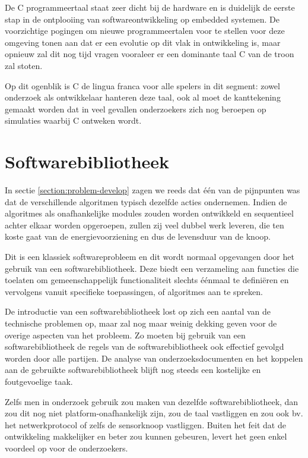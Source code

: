 De C programmeertaal staat zeer dicht bij de hardware en is duidelijk de eerste
stap in de ontplooiing van softwareontwikkeling op embedded systemen. De
voorzichtige pogingen om nieuwe programmeertalen voor te stellen voor deze
omgeving tonen aan dat er een evolutie op dit vlak in ontwikkeling is, maar
opnieuw zal dit nog tijd vragen vooraleer er een dominante taal C van de troon
zal stoten.

Op dit ogenblik is C de lingua franca voor alle spelers in dit segment: zowel
onderzoek als ontwikkelaar hanteren deze taal, ook al moet de kanttekening
gemaakt worden dat in veel gevallen onderzoekers zich nog beroepen op
simulaties waarbij C ontweken wordt.

\section{Softwarebibliotheek}
\label{section:solution-library}

In sectie \ref{section:problem-develop} zagen we reeds dat \'e\'en van de
pijnpunten was dat de verschillende algoritmen typisch dezelfde acties
ondernemen. Indien de algoritmes als onafhankelijke modules zouden worden
ontwikkeld en sequentieel achter elkaar worden opgeroepen, zullen zij veel
dubbel werk leveren, die ten koste gaat van de energievoorziening en dus de
levensduur van de knoop.

Dit is een klassiek softwareprobleem en dit wordt normaal opgevangen door het
gebruik van een softwarebibliotheek. Deze biedt een verzameling aan functies
die toelaten om gemeenschappelijk functionaliteit slechts \'e\'enmaal te
defini\"eren en vervolgens vanuit specifieke toepassingen, of algoritmes aan te
spreken.

De introductie van een softwarebibliotheek lost op zich een aantal van de
technische problemen op, maar zal nog maar weinig dekking geven voor de overige
aspecten van het probleem. Zo moeten bij gebruik van een softwarebibliotheek de
regels van de softwarebibliotheek ook effectief gevolgd worden door alle
partijen. De analyse van onderzoeksdocumenten en het koppelen aan de gebruikte
softwarebibliotheek blijft nog steeds een kostelijke en foutgevoelige taak.

Zelfs men in onderzoek gebruik zou maken van dezelfde softwarebibliotheek, dan
zou dit nog niet platform-onafhankelijk zijn, zou de taal vastliggen en zou ook
bv. het netwerkprotocol of zelfs de sensorknoop vastliggen. Buiten het feit dat
de ontwikkeling makkelijker en beter zou kunnen gebeuren, levert het geen enkel
voordeel op voor de onderzoekers.

